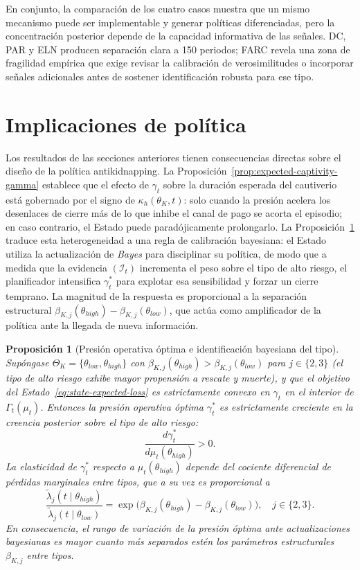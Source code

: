\documentclass[12pt]{article}
\newtheorem{proposition}[theorem]{Proposición}
\theoremstyle{definition}
\theoremstyle{remark}
\newcommand{\1}{\mathbf{1}}
\begin{document}
En conjunto, la comparación de los cuatro casos muestra que un mismo mecanismo puede ser implementable y generar políticas diferenciadas, pero la concentración posterior depende de la capacidad informativa de las señales. DC, PAR y ELN producen separación clara a 150 periodos; FARC revela una zona de fragilidad empírica que exige revisar la calibración de verosimilitudes o incorporar señales adicionales antes de sostener identificación robusta para ese tipo.
\section{Implicaciones de política}
\label{sec:policy-implications}

Los resultados de las secciones anteriores tienen consecuencias directas sobre el diseño de la política antikidnapping. La Proposición~\ref{prop:expected-captivity-gamma} establece que el efecto de $\gamma_t$ sobre la duración esperada del cautiverio está gobernado por el signo de $\kappa_h(\theta_K,t)$: solo cuando la presión acelera los desenlaces de cierre más de lo que inhibe el canal de pago se acorta el episodio; en caso contrario, el Estado puede paradójicamente prolongarlo. La Proposición~\ref{prop:optimal-gamma-beliefs} traduce esta heterogeneidad a una regla de calibración bayesiana: el Estado utiliza la actualización de \textit{Bayes} para disciplinar su política, de modo que a medida que la evidencia $(\mathcal{I}_t)$ incrementa el peso sobre el tipo de alto riesgo, el planificador intensifica $\gamma_t^\ast$ para explotar esa sensibilidad y forzar un cierre temprano. La magnitud de la respuesta es proporcional a la separación estructural $\beta_{K,j}(\theta_{high})-\beta_{K,j}(\theta_{low})$, que actúa como amplificador de la política ante la llegada de nueva información.

\begin{proposition}[Presión operativa óptima e identificación bayesiana del tipo]
\label{prop:optimal-gamma-beliefs}
Supóngase $\Theta_K=\{\theta_{low},\theta_{high}\}$ con $\beta_{K,j}(\theta_{high})>\beta_{K,j}(\theta_{low})$ para $j\in\{2,3\}$ \textup{(}el tipo de alto riesgo exhibe mayor propensión a rescate y muerte\textup{)}, y que el objetivo del Estado~\eqref{eq:state-expected-loss} es estrictamente convexo en $\gamma_t$ en el interior de $\Gamma_t(\mu_t)$. Entonces la presión operativa óptima $\gamma_t^\ast$ es estrictamente creciente en la creencia posterior sobre el tipo de alto riesgo:
\[
\frac{d\gamma_t^\ast}{d\mu_t(\theta_{high})} > 0.
\]
La elasticidad de $\gamma_t^\ast$ respecto a $\mu_t(\theta_{high})$ depende del cociente diferencial de pérdidas marginales entre tipos, que a su vez es proporcional a
\[
\frac{\tilde\lambda_j(t\mid\theta_{high})}{\tilde\lambda_j(t\mid\theta_{low})}
= \exp\!\bigl(\beta_{K,j}(\theta_{high})-\beta_{K,j}(\theta_{low})\bigr), \quad j\in\{2,3\}.
\]
En consecuencia, el rango de variación de la presión óptima ante actualizaciones bayesianas es mayor cuanto más separados estén los parámetros estructurales $\beta_{K,j}$ entre tipos.
\end{proposition}
\end{document}
